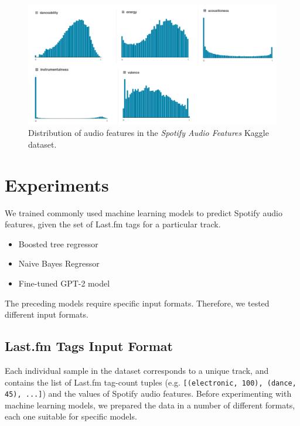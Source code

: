 \documentclass[sn-mathphys]{sn-jnl}%
\theoremstyle{thmstyleone}%
\theoremstyle{thmstyletwo}%
\theoremstyle{thmstylethree}%
\begin{document}
\begin{figure}[h!]
      \centering
      \includegraphics[width=\textwidth]{images/feature-distribution-kaggle.png}
      \caption{Distribution of audio features in the \emph{Spotify Audio Features} Kaggle dataset.}
      \label{fig:audio-features-distribution-kaggle}
\end{figure}




\section{Experiments}

We trained commonly used machine learning models to predict Spotify audio features, given the set of Last.fm tags for a particular track.

\begin{itemize}
      \item Boosted tree regressor \cite{xgboost}
      \item Naive Bayes Regressor \cite{bayesian}
      \item Fine-tuned GPT-2 model \cite{radford2019language}
\end{itemize}

The preceding models require specific input formats.
Therefore, we tested different input formats.

\subsection{Last.fm Tags Input Format}

Each individual sample in the dataset corresponds to a unique track,
and contains the list of Last.fm tag-count tuples (e.g. \verb|[(electronic, 100), (dance, 45), ...]|)
and the values of Spotify audio features.
Before experimenting with machine learning models, we prepared the data in a number of different formats,
each one suitable for specific models.
\end{document}

